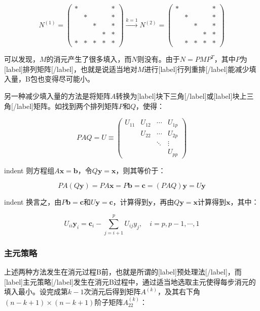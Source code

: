\documentclass[UTF8,nofonts]{ctexart}
\begin{document}
\[
N^{(1)}=\begin{pmatrix}
\ast & & & & \ast \\
& \ast & & & \ast \\
& & \ast & & \ast \\
& & & \ast & \ast \\
\ast & \ast & \ast & \ast & \ast
\end{pmatrix}\xrightarrow{k=1}
N^{(2)}=\begin{pmatrix}
\ast & & & & \ast \\
& \ast & & & \ast \\
& & \ast & & \ast \\
& & & \ast & \ast \\
& \ast & \ast & \ast & \ast
\end{pmatrix}
\]

可以发现，$M$的消元产生了很多填入，而$N$则没有。由于$N=PMP^T$，其中$P$为[label]排列矩阵[/label]，也就是说适当地对$M$进行[label]行列重排[/label]能减少填入量，B包也变得尽可能小。

另一种减少填入量的方法是将矩阵$A$转换为[label]块下三角[/label]或[label]块上三角[/label]矩阵。如找到两个排列矩阵$P$和$Q$，使得：

\[
PAQ=U\equiv\begin{pmatrix}
U_{11} & U_{12} & \cdots & U_{1p} \\
& U_{22} & \cdots & U_{2p} \\
& & \ddots & \vdots \\
& & & U_{pp}
\end{pmatrix}
\]

indent 则方程组$A\boldsymbol{x}=\boldsymbol{b}$，令$Q\boldsymbol{y}=\boldsymbol{x}$，则其等价于：

\[PA(Q\boldsymbol{y})=PA\boldsymbol{x}=P\boldsymbol{b}=\boldsymbol{c}=(PAQ)\boldsymbol{y}=U\boldsymbol{y}\]

indent 换言之，由$P\boldsymbol{b}=\boldsymbol{c}$和$U\boldsymbol{y}=\boldsymbol{c}$，计算得到$\boldsymbol{y}$，再由$Q\boldsymbol{y}=\boldsymbol{x}$计算得到$\boldsymbol{x}$，其中：

\[
U_{ii}\boldsymbol{y}_i=\boldsymbol{c}_i-\sum_{j=i+1}^{p}U_{ij}y_{j},\quad i=p,p-1,\cdots,1
\]

\subsubsection*{主元策略}

上述两种方法发生在消元过程B前，也就是所谓的[label]预处理法[/label]，而[label]主元策略[/label]发生在消元B过程中，通过适当地选取主元使得每步消元的填入最小。设完成第$k-1$次消元后得到矩阵$A^{(k)}$，及其右下角$(n-k+1)\times(n-k+1)$阶子矩阵$A_{22}^{(k)}$：
\end{document}
